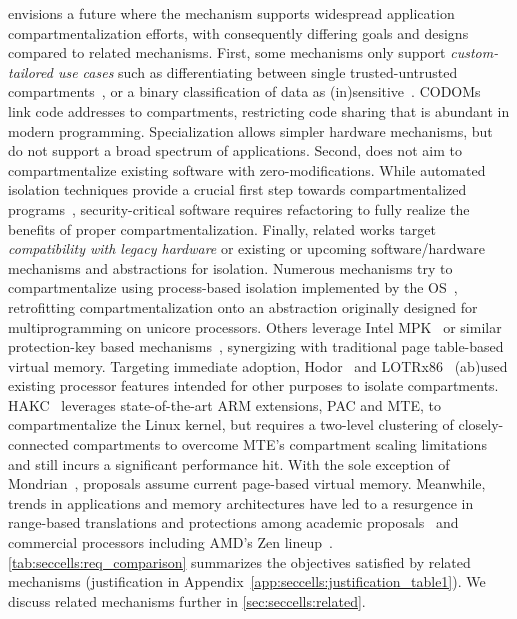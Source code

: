\seccells envisions a future where the mechanism supports 
widespread application
compartmentalization efforts, with consequently differing goals
and designs compared to related mechanisms.
% 
First, some mechanisms only support \emph{custom-tailored use cases}
such as differentiating between single trusted-untrusted 
compartments~\cite{HedayatiGJCSSM19Hodor,KoningCBGA17,Kilpatrick03}, %
or a binary classification of data as (in)sensitive~\cite{FrassettoJLS18}.
CODOMs~\cite{VilanovaBNEV14} link code addresses to compartments,
restricting code sharing that is abundant in modern programming.
Specialization allows simpler hardware mechanisms, but do not support
a broad spectrum of applications.
Second, \seccells does not aim to compartmentalize existing software with
zero-modifications.
While automated isolation techniques provide a crucial first step towards
compartmentalized programs~\cite{RoesslerAPMPKPB21,KirthDCLDGNVF22,
VasilakisKRDDS17}, security-critical software requires refactoring to fully
realize the benefits of proper compartmentalization.
Finally, related works target \emph{compatibility with legacy hardware}
or existing or upcoming software/hardware mechanisms and abstractions for 
isolation.
Numerous mechanisms try to compartmentalize using process-based isolation
implemented by the OS~\cite{LittonVE0BD16,DuHXZC19XPC,KleinEHACDEEKNSTW09}, 
retrofitting compartmentalization onto an abstraction originally designed for
multiprogramming on unicore processors.
Others leverage Intel MPK~\cite{HedayatiGJCSSM19Hodor,ERIMOberwagner19,KoningCBGA17}
or similar protection-key based mechanisms~\cite{SchrammelWSS0MG20Donky},
synergizing with traditional page table-based virtual memory.
Targeting immediate adoption, Hodor~\cite{HedayatiGJCSSM19Hodor} and 
LOTRx86~\cite{LeeSK18} (ab)used existing processor features intended for 
other purposes to isolate compartments.
HAKC~\cite{mckee2022preventing} leverages state-of-the-art ARM extensions, 
PAC and MTE, to compartmentalize the Linux kernel, but requires a two-level 
clustering of closely-connected compartments to overcome MTE's 
compartment scaling limitations and still incurs a significant performance hit.
With the sole exception of Mondrian~\cite{WitchelCA02MMP}, proposals
assume current page-based virtual memory.
Meanwhile, trends in applications and memory architectures have led to a 
resurgence in range-based translations and protections among academic 
proposals~\cite{BasuGCHS13,YanLNB19,PhamVJB12,0003BOBFP21midgard,KarakostasGACHM15}
and commercial processors including AMD's Zen lineup~\cite{preservingvma}.
\autoref{tab:seccells:req_comparison} summarizes the objectives satisfied by related 
mechanisms (justification in Appendix~\ref{app:seccells:justification_table1}).
We discuss related mechanisms further in \autoref{sec:seccells:related}.
 
